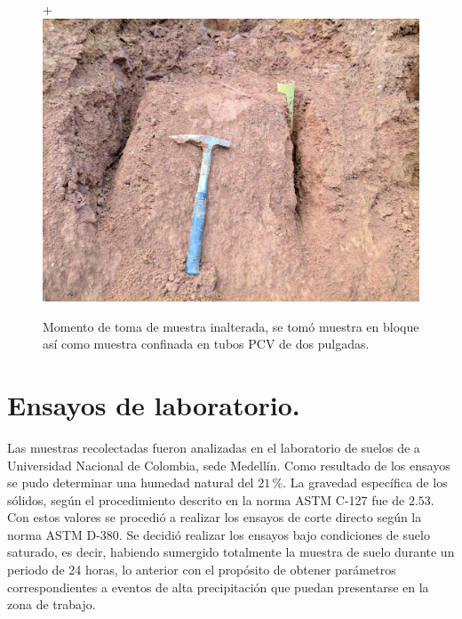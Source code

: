 \begin{figure}[H]+
\centering
\includegraphics[scale=0.20]{img/estacion11.jpg}
\caption{Momento de toma de muestra inalterada, se tom\'o muestra en bloque as\'i como muestra confinada en tubos PCV de dos pulgadas.}
\label{fig:toma-bloque}
\end{figure}

\section{Ensayos de laboratorio.}

Las muestras recolectadas fueron analizadas en el laboratorio de suelos de a Universidad Nacional de Colombia, sede Medell\'in.
Como resultado de los ensayos se pudo determinar una humedad natural del \(21\,\%\).
La gravedad espec\'ifica de los s\'olidos, seg\'un el procedimiento descrito en la norma ASTM C-127 fue de \(2.53\).
Con estos valores se procedi\'o a realizar los ensayos de corte directo seg\'un la norma ASTM D-380. Se decidi\'o realizar los ensayos bajo condiciones de suelo saturado, es decir, habiendo sumergido totalmente la muestra de suelo durante un periodo de 24 horas, lo anterior con el prop\'osito de obtener par\'ametros correspondientes a eventos de alta precipitaci\'on que puedan presentarse en la zona de trabajo.

